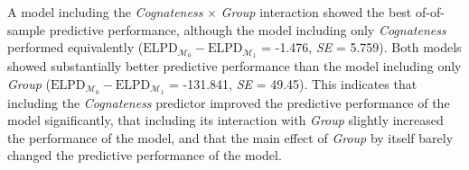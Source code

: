 \documentclass[
  letterpaper,
  DIV=11,
  numbers=noendperiod]{scrartcl}
\begin{document}
A model including the \emph{Cognateness} \(\times\) \emph{Group}
interaction showed the best of-of-sample predictive performance,
although the model including only \emph{Cognateness} performed
equivalently
(\(\text{ELPD}_{\mathcal{M_0}} - \text{ELPD}_{\mathcal{M_1}}\) = -1.476,
\emph{SE} = 5.759). Both models showed substantially better predictive
performance than the model including only \emph{Group}
(\(\text{ELPD}_{\mathcal{M_0}} - \text{ELPD}_{\mathcal{M_1}}\) =
-131.841, \emph{SE} = 49.45). This indicates that including the
\emph{Cognateness} predictor improved the predictive performance of the
model significantly, that including its interaction with \emph{Group}
slightly increased the performance of the model, and that the main
effect of \emph{Group} by itself barely changed the predictive
performance of the model.
\end{document}

